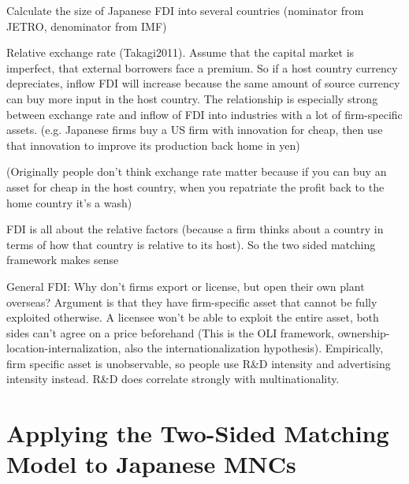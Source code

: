 Calculate the size of Japanese FDI into several countries (nominator from JETRO,
denominator from IMF)

Relative exchange rate (Takagi2011). Assume that the capital market is
imperfect, that external borrowers face a premium. So if a host country currency
depreciates, inflow FDI will increase because the same amount of source currency
can buy more input in the host country. The relationship is especially strong
between exchange rate and inflow of FDI into industries with a lot of
firm-specific assets. (e.g. Japanese firms buy a US firm with innovation for
cheap, then use that innovation to improve its production back home in yen) 

(Originally people don't think exchange rate matter because if you can buy an
asset for cheap in the host country, when you repatriate the profit back to the
home country it's a wash)

FDI is all about the relative factors (because a firm thinks about a country in
terms of how that country is relative to its host). So the two sided matching
framework makes sense

General FDI: Why don't firms export or license, but open their own plant
overseas? Argument is that they have firm-specific asset that cannot be fully
exploited otherwise. A licensee won't be able to exploit the entire asset, both
sides can't agree on a price beforehand (This is the OLI framework,
ownership-location-internalization, also the internationalization hypothesis). Empirically, firm specific asset is
unobservable, so people use R\&D intensity and advertising intensity instead.
R\&D does correlate strongly with multinationality.


\section{Applying the Two-Sided Matching Model to Japanese MNCs}
\label{sec:application}

